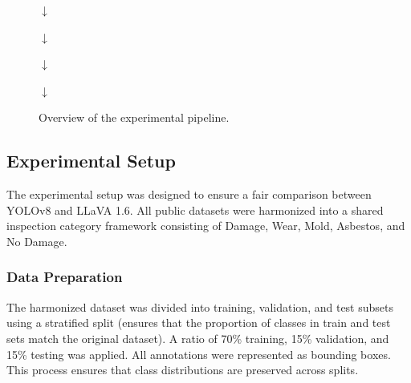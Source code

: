 %  

\begin{figure}[h]
\centering
{}

\vspace{0.2cm}
$\downarrow$

\vspace{0.2cm}

\vspace{0.2cm}
$\downarrow$

\vspace{0.2cm}

\vspace{0.2cm}
$\downarrow$

\vspace{0.2cm}

\vspace{0.2cm}
$\downarrow$
\vspace{0.2cm}

\caption{Overview of the experimental pipeline.}
\label{fig:pipeline}
\end{figure}

%                                 

\subsection{Experimental Setup}
\label{subsec:experimental_setup}

The experimental setup was designed to ensure a fair comparison between YOLOv8 and LLaVA 1.6. All public datasets were harmonized into a shared inspection category framework consisting of Damage, Wear, Mold, Asbestos, and No Damage.

\subsubsection{Data Preparation}

The harmonized dataset was divided into training, validation, and test subsets using a stratified split (ensures that the proportion of classes in train and test sets match the original dataset)\cite{jocher_ultralytics_2023}. A ratio of 70\% training, 15\% validation, and 15\% testing was applied. All annotations were represented as bounding boxes. This process ensures that class distributions are preserved across splits.


